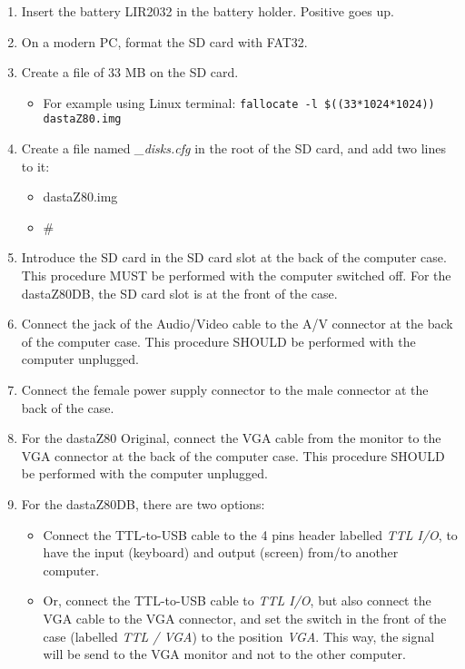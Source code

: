 \begin{enumerate}
    \item Insert the battery LIR2032 in the battery holder. Positive goes up.
    \item On a modern PC, format the SD card with FAT32.
    \item Create a file of 33 MB on the SD card.
    \begin{itemize}
        \item For example using Linux terminal: \texttt{fallocate -l \$((33*1024*1024)) dastaZ80.img}
    \end{itemize}
    \item Create a file named \textit{\_disks.cfg} in the root of the SD card,
    and add two lines to it:
    \begin{itemize}
        \item dastaZ80.img
        \item \#
    \end{itemize}
    \item Introduce the SD card in the SD card slot at the back of the
        computer case. This procedure MUST be performed with the computer
        switched off. For the dastaZ80DB, the SD card slot is at the front of
        the case.
    \item Connect the jack of the Audio/Video cable to the A/V connector at
        the back of the computer case. This procedure SHOULD be performed with
        the computer unplugged.
    \item Connect the female power supply connector to the male connector at
        the back of the case.
    \item For the dastaZ80 Original, connect the VGA cable from the monitor to
        the VGA connector at the back of the computer case. This procedure
        SHOULD be performed with the computer unplugged.
    \item For the dastaZ80DB, there are two options:
    \begin{itemize}
        \item Connect the TTL-to-USB cable to the 4 pins header labelled
            \textit{TTL I/O}, to have the input (keyboard) and output (screen)
            from/to another computer.
        \item Or, connect the TTL-to-USB cable to \textit{TTL I/O}, but also
            connect the VGA cable to the VGA connector, and set the switch in
            the front of the case (labelled \textit{TTL / VGA}) to the position
            \textit{VGA}. This way, the signal will be send to the VGA monitor
            and not to the other computer.
    \end{itemize}

\end{enumerate}

